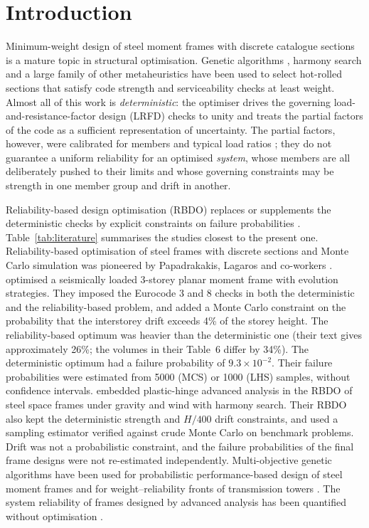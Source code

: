 \section{Introduction}\label{sec:intro}

Minimum-weight design of steel moment frames with discrete catalogue sections is a mature
topic in structural optimisation. Genetic algorithms \citep{Camp1998,Pezeshk2000}, harmony
search \citep{Degertekin2008} and a large family of other metaheuristics \citep{SakaGeem2013}
have been used to select hot-rolled sections that satisfy code strength and serviceability
checks at least weight. Almost all of this work is \emph{deterministic}: the optimiser drives
the governing load-and-resistance-factor design (LRFD) checks to unity and treats the partial
factors of the code as a sufficient representation of uncertainty. The partial factors,
however, were calibrated for members and typical load ratios \citep{Ellingwood1980,Galambos1982};
they do not guarantee a uniform reliability for an optimised \emph{system}, whose members are
all deliberately pushed to their limits and whose governing constraints may be strength in one
member group and drift in another.

Reliability-based design optimisation (RBDO) replaces or supplements the deterministic checks by
explicit constraints on failure probabilities \citep{Frangopol1985,Enevoldsen1994,Valdebenito2010,Aoues2010}.
Table~\ref{tab:literature} summarises the studies closest to the present one. Reliability-based
optimisation of steel frames with discrete sections and Monte Carlo simulation was pioneered by
Papadrakakis, Lagaros and co-workers \citep{PapadrakakisLagaros2002,Papadrakakis2004,LagarosPapadrakakis2007}.
\citet{Papadrakakis2004} optimised a seismically loaded 3-storey planar moment frame with evolution
strategies. They imposed the Eurocode 3 and 8 checks in both the deterministic and the
reliability-based problem, and added a Monte Carlo constraint on the probability that the interstorey
drift exceeds 4\% of the storey height. The reliability-based optimum was heavier than the
deterministic one (their text gives approximately 26\%; the volumes in their Table~6 differ by 34\%).
The deterministic optimum had a failure probability of $9.3\times10^{-2}$. Their failure probabilities
were estimated from 5000 (MCS) or 1000 (LHS) samples, without confidence intervals.
\citet{TruongKim2017} embedded plastic-hinge advanced analysis in the RBDO of steel space frames under
gravity and wind with harmony search. Their RBDO also kept the deterministic strength and $H/400$ drift
constraints, and used a sampling estimator verified against crude Monte Carlo on benchmark problems.
Drift was not a probabilistic constraint, and the failure probabilities of the final frame designs were
not re-estimated independently. Multi-objective genetic algorithms have been used for probabilistic
performance-based design of steel moment frames \citep{Foley2007} and for weight--reliability fronts
of transmission towers \citep{Mathakari2007}. The system reliability of frames designed by advanced
analysis has been quantified without optimisation \citep{Buonopane2006,Zhang2016}.

